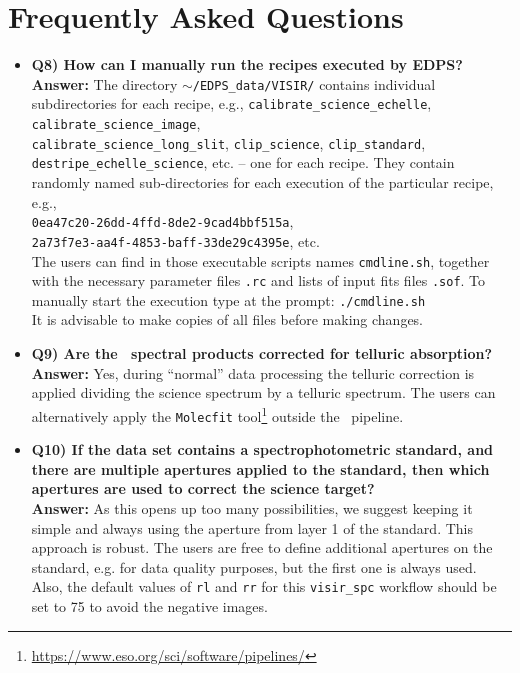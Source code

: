 \section{Frequently Asked Questions}
\label{sec:faq}


\begin{itemize}
\item {\bf Q8) How can I manually run the recipes executed by EDPS?}\\
{\bf Answer:} The directory {\tt $\sim$/EDPS\_data/VISIR/} contains individual subdirectories for each recipe, e.g., {\tt calibrate\_science\_echelle}, 
{\tt calibrate\_science\_image},\\ {\tt calibrate\_science\_long\_slit}, 
{\tt clip\_science}, {\tt clip\_standard},\\ {\tt destripe\_echelle\_science}, 
etc. -- one for each recipe. They contain randomly named sub-directories 
for each execution of the particular recipe, e.g.,\\ 
{\tt 0ea47c20-26dd-4ffd-8de2-9cad4bbf515a},\\ 
{\tt 2a73f7e3-aa4f-4853-baff-33de29c4395e}, etc.\\ 
The users can find in those executable scripts names {\tt cmdline.sh}, together with the necessary parameter files {\tt *.rc} and lists of input fits files {\tt *.sof}. To manually start the execution type at the prompt: {\tt ./cmdline.sh}\\
It is advisable to make copies of all files before making changes.
\end{itemize}

\begin{itemize}
\item {\bf Q9) Are the \instname\ spectral products corrected for telluric absorption?}\\
{\bf Answer:} Yes, during ``normal'' data processing the telluric correction is applied dividing the science spectrum by a telluric spectrum. The users can alternatively apply the {\tt Molecfit} tool\footnote{\url{https://www.eso.org/sci/software/pipelines/}} outside the \instname\ pipeline.
\end{itemize}

\begin{itemize}
\item {\bf Q10) If the data set contains a spectrophotometric standard, and there are multiple apertures applied to the standard, then which apertures are used to correct the science target?}\\
{\bf Answer:} As this opens up too many possibilities, we suggest keeping it simple and always using the aperture from layer 1 of the standard. This approach is robust. The users are free to define additional apertures on the standard, e.g. for data quality purposes, but the first one is always used. Also, the default values of {\tt rl} and {\tt rr} for this {\tt visir\_spc} workflow should be set to 75 to avoid the negative images.
\end{itemize}
